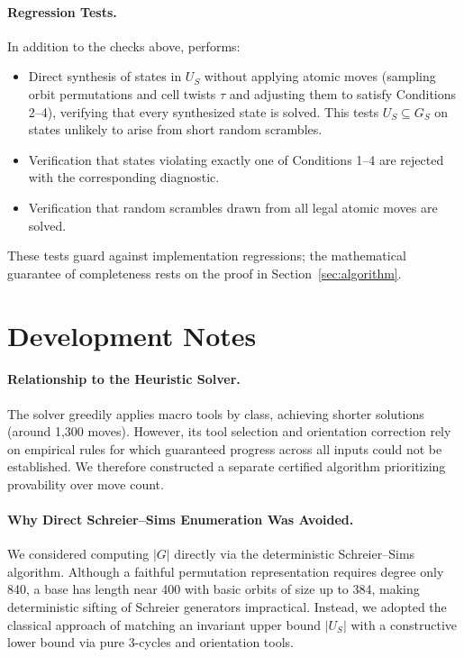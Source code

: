 \documentclass[a4paper,11pt]{article}
\begin{document}
\paragraph{Regression Tests.}
In addition to the checks above,  performs:
\begin{itemize}
\item Direct synthesis of states in $U_S$ without applying atomic moves (sampling orbit permutations and cell twists $\tau$ and adjusting them to satisfy Conditions 2--4), verifying that every synthesized state is solved. This tests $U_S\subseteq G_S$ on states unlikely to arise from short random scrambles.
\item Verification that states violating exactly one of Conditions 1--4 are rejected with the corresponding diagnostic.
\item Verification that random scrambles drawn from all legal atomic moves are solved.
\end{itemize}
These tests guard against implementation regressions; the mathematical guarantee of completeness rests on the proof in Section~\ref{sec:algorithm}.

\section{Development Notes}

\paragraph{Relationship to the Heuristic Solver.}
The solver  greedily applies macro tools by class, achieving shorter solutions (around 1,300 moves).
However, its tool selection and orientation correction rely on empirical rules for which guaranteed progress across all inputs could not be established.
We therefore constructed a separate certified algorithm prioritizing provability over move count.

\paragraph{Why Direct Schreier--Sims Enumeration Was Avoided.}
We considered computing $|G|$ directly via the deterministic Schreier--Sims algorithm.
Although a faithful permutation representation requires degree only 840, a base has length near 400 with basic orbits of size up to 384, making deterministic sifting of Schreier generators impractical.
Instead, we adopted the classical approach of matching an invariant upper bound $|U_S|$ with a constructive lower bound via pure 3-cycles and orientation tools.
\end{document}
